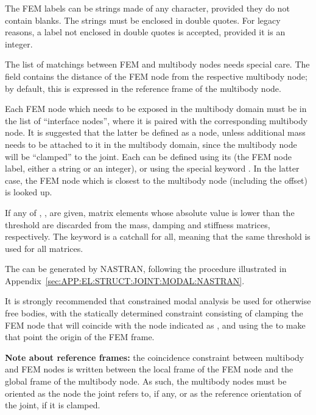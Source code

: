 The FEM labels can be strings made of any character,
provided they do not contain blanks.
The strings must be enclosed in double quotes.
For legacy reasons, a label not enclosed in double quotes
is accepted, provided it is an integer.

The list of matchings between FEM and multibody nodes needs
special care.
The  field contains the distance
of the FEM node from the respective multibody node; by default,
this is expressed in the reference frame of the multibody node.

Each FEM node which needs to be exposed in the multibody domain must be 
in the list of ``interface nodes'', where it is paired with the corresponding multibody node.
It is suggested that the latter be defined as a  node, unless additional mass needs to be attached to it in the multibody domain,
since the multibody node will be ``clamped'' to the  joint.
Each  can be defined using its  (the FEM node label, either a string or an integer),
or using the special keyword .
In the latter case, the FEM node which is closest to the multibody node (including the offset)
is looked up.

If any of , ,  are given,
matrix elements whose absolute value is lower than the threshold
are discarded from the mass, damping and stiffness matrices, respectively.
The keyword  is a catchall for all,
meaning that the same threshold is used for all matrices.

The  can be generated by NASTRAN, 
following the procedure illustrated
in Appendix~\ref{sec:APP:EL:STRUCT:JOINT:MODAL:NASTRAN}.

It is strongly recommended that constrained modal analysis
be used for otherwise free bodies, with the statically 
determined constraint consisting of clamping the FEM node 
that will coincide with the node indicated as ,
and using the  to make that point the origin
of the FEM frame.

\textbf{Note about reference frames:} the coincidence constraint between 
multibody and FEM nodes is written between the local frame 
of the FEM node and the global frame of the multibody node.
As such, the multibody nodes must be oriented as the 
node the  joint refers to, if any, or as the reference
orientation of the  joint, if it is clamped.

